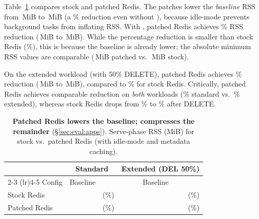 Table~\ref{tab:redis_patched} compares stock and patched Redis.
The patches lower the \emph{baseline} RSS from
\ablRedisBaselineServeRss\,MiB to \ablRedisPatchedBaselineServeRss\,MiB
(a \redisPatchBaselineRedPct\% reduction even without \sys),
because idle-mode prevents background tasks from inflating RSS\@.
With \sys, patched Redis achieves \ablRedisPatchedDefaultRssRedInt\%
RSS reduction (\ablRedisPatchedBaselineServeRss\,MiB to
\ablRedisPatchedDefaultServeRss\,MiB).  While the percentage
reduction is smaller than stock Redis (\ablRedisDefaultRssRedInt\%),
this is because the baseline is already lower; the absolute
minimum RSS values are comparable
(\ablRedisPatchedDefaultMinRss\,MiB patched vs.\
\ablRedisDefaultMinRss\,MiB stock).

On the extended workload (with 50\% DELETE), patched Redis achieves
\ablRedisExtPatchedDefaultRssRedInt\% reduction
(\ablRedisExtPatchedBaselineServeRss\,MiB to
\ablRedisExtPatchedDefaultServeRss\,MiB), compared to
\ablRedisExtDefaultRssRedInt\% for stock Redis.  Critically,
patched Redis achieves comparable reduction on
\emph{both} workloads (\ablRedisPatchedDefaultRssRedInt\% standard
vs.\ \ablRedisExtPatchedDefaultRssRedInt\% extended), whereas stock
Redis drops from \ablRedisDefaultRssRedInt\% to
\ablRedisExtDefaultRssRedInt\% after DELETE\@.

\begin{table}[t]
\caption{\textbf{Patched Redis lowers the baseline; \sys compresses
  the remainder}
  (\S\ref{sec:eval:apps}).  Serve-phase RSS (MiB) for stock vs.\
  patched Redis (with idle-mode and metadata caching).}
\label{tab:redis_patched}
\centering\small
\begin{tabular}{lrrrr}
\toprule
 & \multicolumn{2}{c}{Standard} & \multicolumn{2}{c}{Extended (DEL 50\%)} \\
\cmidrule(lr){2-3} \cmidrule(lr){4-5}
Config & Baseline & \sys & Baseline & \sys \\
\midrule
Stock Redis   & \ablRedisBaselineServeRss  & \textbf{\ablRedisDefaultServeRss} (\ablRedisDefaultRssRedInt\%) & \ablRedisExtBaselineServeRss  & \textbf{\ablRedisExtDefaultServeRss} (\ablRedisExtDefaultRssRedInt\%) \\
Patched Redis & \ablRedisPatchedBaselineServeRss & \textbf{\ablRedisPatchedDefaultServeRss} (\ablRedisPatchedDefaultRssRedInt\%) & \ablRedisExtPatchedBaselineServeRss & \textbf{\ablRedisExtPatchedDefaultServeRss} (\ablRedisExtPatchedDefaultRssRedInt\%) \\
\bottomrule
\end{tabular}
\end{table}

